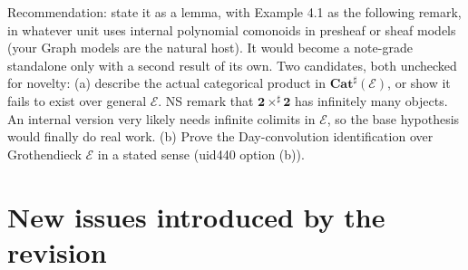 \documentclass[10pt]{amsart}
\newcommand{\Cat}{\mathbf{Cat}}
\newcommand{\E}{\mathcal{E}}
\begin{document}
Recommendation: state it as a lemma, with Example 4.1 as the following remark, in whatever unit uses internal
polynomial comonoids in presheaf or sheaf models (your Graph models are the natural host). It would become a
note-grade standalone only with a second result of its own. Two candidates, both unchecked for novelty:
(a) describe the actual categorical product in $\Cat^\sharp(\E)$, or show it fails to exist over general $\E$. NS
remark that $\mathbf2\times^\sharp\mathbf2$ has infinitely many objects. An internal version very likely needs infinite
colimits in $\E$, so the base hypothesis would finally do real work.
(b) Prove the Day-convolution identification over Grothendieck $\E$ in a stated sense (uid440 option (b)).

\section{New issues introduced by the revision}
\end{document}
